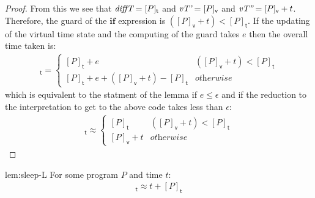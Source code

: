 \documentclass[preprint]{sigplanconf}
\renewcommand{\leq}{\leqslant}
\newcommand{\note}[1]{{\color{blue}{#1}}}
\theoremstyle{definition}
\newcommand{\sleep}{\mathsf{sleep}\;}
\newcommand{\vtime}[1]{[#1]_{\mathsf{v}}}
\newcommand{\etime}[1]{[#1]_{\mathsf{t}}}
\begin{document}
\begin{proof}
From this we see that $\emph{diffT} = \etime{P}$ and $\emph{vT'} = \vtime{P}$ and 
 $\emph{vT''} = \vtime{P} + t$. Therefore, the guard of the 
\ensuremath{\mathbf{if}} expression is $(\vtime{P} + t) < \etime{P}$.
If the updating of the virtual time state and the computing of 
the guard takes $e$ then the overall time taken is:
\begin{align*}
\etime{P; \sleep{} t} = 
 \begin{cases}
   \etime{P} + e & (\vtime{P} + t) < \etime{P}  \\
   \etime{P} + e + (\vtime{P} + t) - \etime{P}  & \textit{otherwise}
 \end{cases}
\end{align*}
which is equivalent to the statment of the lemma if $e \leq \epsilon$
and if the reduction to the interpretation to get to the above code 
takes less than $\epsilon$:
\begin{align*}
\etime{P; \sleep{} t} \approx 
 \begin{cases}
   \etime{P} & (\vtime{P} + t) < \etime{P} \\
   \vtime{P} + t  &  \textit{otherwise}
 \end{cases}
\end{align*}
\end{proof}

\note{I suppose this is ok- I'm a bit wary about saying the simplification
takes less than $\epsilon$. It surely does, but I am only hand waving. 
We could time $e$ though in the model and show it is less than the schedule
time. We could go further and time the analogous parts of the SonicPi implementation
to check that the real $e$ is less than $\epsilon$. This would be good.}

\begin{replemma}{lem:sleep-L}
For some program $P$ and time $t$:
\begin{align*}
\etime{\sleep{} t; P} \approx t + \etime{P}
\end{align*}
\end{replemma}
\end{document}
